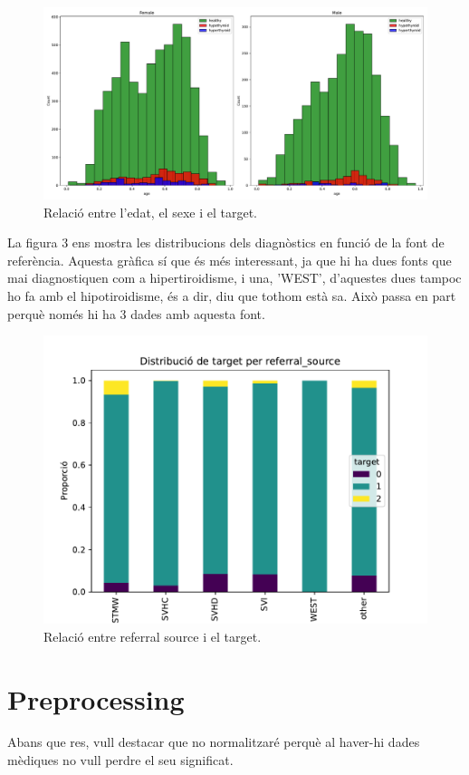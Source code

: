 \documentclass[9pt,a4paper,twoside]{tau-class/tau}
\begin{document}
    \begin{figure}[H]
		\centering
		\includegraphics[width=0.75\columnwidth]{relacio_edat_sexe_target.pdf}
		\caption{Relació entre l'edat, el sexe i el target.}
		\label{fig:figure2}
	\end{figure}

    La figura 3 ens mostra les distribucions dels diagnòstics en funció de la font de referència. Aquesta gràfica sí que és més interessant, ja que hi ha dues fonts que mai diagnostiquen com a hipertiroidisme, i una, 'WEST', d'aquestes dues tampoc ho fa amb el hipotiroidisme, és a dir, diu que tothom està sa. Això passa en part perquè només hi ha 3 dades amb aquesta font.
    \begin{figure}[H]
		\centering
		\includegraphics[width=0.75\columnwidth]{proporcio_referral_source_target.pdf}
		\caption{Relació entre referral source i el target.}
		\label{fig:figure3}
	\end{figure}

\section{Preprocessing}

    Abans que res, vull destacar que no normalitzaré perquè al haver-hi dades mèdiques no vull perdre el seu significat.
\end{document}
